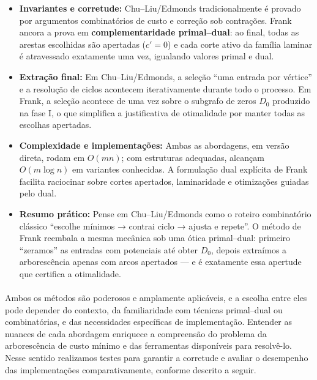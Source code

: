 \documentclass[12pt,a4paper]{article}
\def\emph#1{#1}%
\begin{document}
\begin{itemize}
    \item \textbf{Invariantes e corretude:} \emph{Chu–Liu/Edmonds} tradicionalmente é provado por argumentos combinatórios de custo e correção sob contrações. \emph{Frank} ancora a prova em \textbf{complementaridade primal–dual}: ao final, todas as arestas escolhidas são \emph{apertadas} (\(c'=0\)) e cada corte ativo da família laminar é atravessado exatamente uma vez, igualando valores primal e dual.

    \item \textbf{Extração final:} Em \emph{Chu–Liu/Edmonds}, a seleção “uma entrada por vértice” e a resolução de ciclos acontecem iterativamente durante todo o processo. Em \emph{Frank}, a seleção acontece de uma vez sobre o subgrafo de zeros \(D_0\) produzido na fase I, o que simplifica a justificativa de otimalidade por manter todas as escolhas \emph{apertadas}.
    
    \item \textbf{Complexidade e implementações:} Ambas as abordagens, em versão direta, rodam em \(O(mn)\); com estruturas adequadas, alcançam \(O(m\log n)\) em variantes conhecidas. A formulação dual explícita de \emph{Frank} facilita raciocinar sobre \emph{cortes apertados}, laminaridade e otimizações guiadas pelo dual.
    
    \item \textbf{Resumo prático:} Pense em \emph{Chu–Liu/Edmonds} como o roteiro combinatório clássico “escolhe mínimos → contrai ciclo → ajusta e repete”. O método de \emph{Frank} reembala a mesma mecânica sob uma ótica \emph{primal–dual}: primeiro “zeramos” as entradas com potenciais até obter \(D_0\), depois extraímos a arborescência apenas com arcos apertados — e é exatamente essa apertude que certifica a otimalidade.
\end{itemize}

\paragraph{}
Ambos os métodos são poderosos e amplamente aplicáveis, e a escolha entre eles pode depender do contexto, da familiaridade com técnicas primal–dual ou combinatórias, e das necessidades específicas de implementação. Entender as nuances de cada abordagem enriquece a compreensão do problema da arborescência de custo mínimo e das ferramentas disponíveis para resolvê-lo. Nesse sentido realizamos testes para garantir a corretude e avaliar o desempenho das implementações comparativamente, conforme descrito a seguir.
\end{document}
